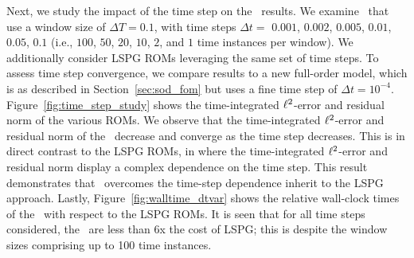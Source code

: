 Next, we study the impact of the time step on the \methodAcronymROM\ results. We examine \methodAcronymROMs\ that use a
window size of $\Delta T = 0.1$, with time steps $\Delta t =$  $0.001$, $0.002$, $0.005$, $0.01$, $0.05$, $0.1$ (i.e.,  
$100$, $50$, $20$, $10$, $2$, and $1$ time instances per window). We additionally 
consider LSPG ROMs leveraging the same set of time steps. To assess time step convergence, we compare results to a new full-order model, which is as described in Section~\ref{sec:sod_fom} but uses a fine time step of $\Delta t = 10^{-4}$. Figure~\ref{fig:time_step_study} shows the time-integrated $\ell^2$-error and residual norm  
of the various ROMs. We observe that the time-integrated $\ell^2$-error and residual norm 
of the \methodAcronymROMs\ decrease and converge as the time step decreases. This is in direct contrast to the LSPG ROMs, in where the time-integrated $\ell^2$-error and residual norm display a complex dependence on the time step. This result 
demonstrates that \methodAcronym\ overcomes the time-step dependence inherit to the LSPG approach. Lastly, Figure~\ref{fig:walltime_dtvar}
shows the relative wall-clock times of the \methodAcronymROMs\ with respect to the LSPG ROMs. It is seen that for all time steps considered, the \methodAcronymROMs\ 
are less than 6x the cost of LSPG; this is despite the window sizes comprising up to 100 time instances. 
